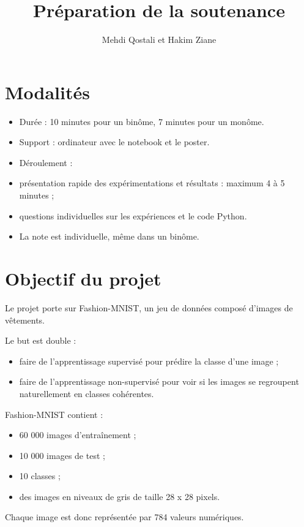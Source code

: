 \documentclass[11pt,a4paper]{article}
\title{Préparation de la soutenance}
\author{Mehdi Qostali et Hakim Ziane}
\date{}
\begin{document}
\maketitle
\tableofcontents
\newpage


\section{Modalités}

\begin{itemize}
\item Durée : 10 minutes pour un binôme, 7 minutes pour un monôme.
\item Support : ordinateur avec le notebook et le poster.
\item Déroulement :
\item présentation rapide des expérimentations et résultats : maximum 4 à 5 minutes ;
\item questions individuelles sur les expériences et le code Python.
\item La note est individuelle, même dans un binôme.
\end{itemize}

\section{Objectif du projet}

Le projet porte sur Fashion-MNIST, un jeu de données composé d'images de vêtements.

Le but est double :

\begin{itemize}
\item faire de l'apprentissage supervisé pour prédire la classe d'une image ;
\item faire de l'apprentissage non-supervisé pour voir si les images se regroupent naturellement en classes cohérentes.
\end{itemize}

Fashion-MNIST contient :

\begin{itemize}
\item 60 000 images d'entraînement ;
\item 10 000 images de test ;
\item 10 classes ;
\item des images en niveaux de gris de taille 28 x 28 pixels.
\end{itemize}

Chaque image est donc représentée par 784 valeurs numériques.
\end{document}
